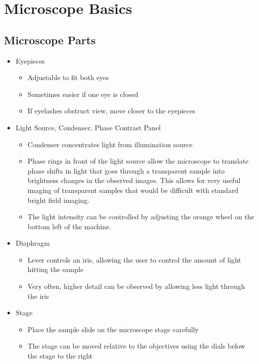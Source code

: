 \chapter{Microscope Basics}
\thispagestyle{fancy}

\section*{Microscope Parts}
\begin{itemize}
\setlength\itemsep{1pt}
\item Eyepieces
\begin{itemize}
	\setlength\itemsep{1pt}
	\item Adjustable to fit both eyes
	\item Sometimes easier if one eye is closed
	\item If eyelashes obstruct view, move closer to the eyepieces
\end{itemize}
\item Light Source, Condenser, Phase Contrast Panel
\begin{itemize}
	\setlength\itemsep{1pt}
	\item Condenser concentrates light from illumination source
	\item Phase rings in front of the light source allow the microscope to translate phase shifts in light that goes through a transparent sample into brightness changes in the observed images. This allows for very useful imaging of transparent samples that would be difficult with standard bright field imaging.
	\item The light intensity can be controlled by adjusting the orange wheel on the bottom left of the machine.
\end{itemize}
\item Diaphragm
\begin{itemize}
	\setlength\itemsep{1pt}
	\item Lever controls an iris, allowing the user to control the amount of light hitting the sample
	\item Very often, higher detail can be observed by allowing less light through the iris
\end{itemize}
\item Stage
\begin{itemize}
	\setlength\itemsep{1pt}
	\item Place the sample slide on the microscope stage carefully
	\item The stage can be moved relative to the objectives using the dials below the stage to the right

\end{itemize}
\end{itemize}
